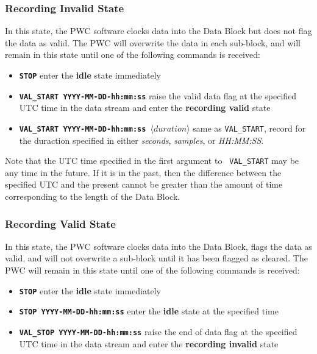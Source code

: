 \subsubsection{Recording Invalid State}

In this state, the PWC software clocks data into the Data Block but
does not flag the data as valid.  The PWC will overwrite the data in
each sub-block, and will remain in this state until one of the
following commands is received:

\begin{itemize}
\item {\tt\bf STOP} enter the {\bf idle} state immediately
\item {\tt\bf VAL\_START YYYY-MM-DD-hh:mm:ss} raise the valid data flag
	at the specified UTC time in the data stream and enter the {\bf
	recording valid} state
\item {\tt\bf VAL\_START YYYY-MM-DD-hh:mm:ss $\langle duration\rangle$} same 
	as {\tt VAL\_START}, record for the duraction specified in either
	{\it seconds}, {\it samples}, or {\it HH:MM:SS}.
\end{itemize}

Note that the UTC time specified in the first argument to {\tt
VAL\_START} may be any time in the future.  If it is in the past, then
the difference between the specified UTC and the present cannot be
greater than the amount of time corresponding to the length of the
Data Block.

\subsubsection{Recording Valid State}

In this state, the PWC software clocks data into the Data Block, flags
the data as valid, and will not overwrite a sub-block until it has
been flagged as cleared.  The PWC will remain in this state until one
of the following commands is received:

\begin{itemize}
\item {\tt\bf STOP} enter the {\bf idle} state immediately
\item {\tt\bf STOP YYYY-MM-DD-hh:mm:ss} enter the {\bf idle} state
	at the specified time
\item {\tt\bf VAL\_STOP YYYY-MM-DD-hh:mm:ss} raise the end of data flag
	at the specified UTC time in the data stream and enter the {\bf
	recording invalid} state
\end{itemize}


